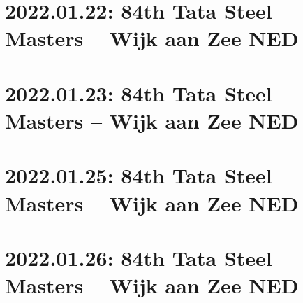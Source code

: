 \documentclass[11pt]{article}
\begin{document}

\pagebreak[4]


\pagebreak[4]

\section{2022.01.22: 84th Tata Steel Masters -- Wijk aan Zee NED}

\pagebreak[4]


\pagebreak[4]


\pagebreak[4]


\pagebreak[4]


\pagebreak[4]


\pagebreak[4]


\pagebreak[4]

\section{2022.01.23: 84th Tata Steel Masters -- Wijk aan Zee NED}

\pagebreak[4]


\pagebreak[4]


\pagebreak[4]


\pagebreak[4]


\pagebreak[4]


\pagebreak[4]


\pagebreak[4]

\section{2022.01.25: 84th Tata Steel Masters -- Wijk aan Zee NED}

\pagebreak[4]


\pagebreak[4]


\pagebreak[4]


\pagebreak[4]


\pagebreak[4]


\pagebreak[4]


\pagebreak[4]

\section{2022.01.26: 84th Tata Steel Masters -- Wijk aan Zee NED}

\pagebreak[4]
\end{document}
